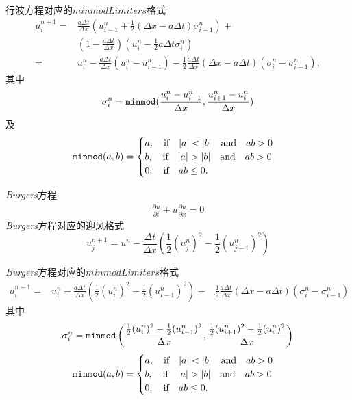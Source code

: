 \documentclass[10.5pt
]{article}
\begin{document}
 
行波方程对应的$minmod Limiters$格式
\begin{equation}
\begin{aligned}
u_i^{n+1}= & \frac{a \Delta t}{\Delta x}\left(u_{i-1}^n+\frac{1}{2}(\Delta x-a \Delta t) \sigma_{i-1}^n\right)+ \\
& \left(1-\frac{a \Delta t}{\Delta x}\right)\left(u_i^n-\frac{1}{2} a \Delta t \sigma_i^n\right) \\
= & u_i^n-\frac{a \Delta t}{\Delta x}\left(u_i^n-u_{i-1}^n\right)-\frac{1}{2} \frac{a \Delta t}{\Delta x}(\Delta x-a \Delta t)\left(\sigma_i^n-\sigma_{i-1}^n\right),
\end{aligned}
\end{equation}
其中
\begin{equation}
	\sigma_i^n = \verb|minmod| ( \frac{u_i^n - u_{i-1}^{n}}{ \Delta x }, \frac{u_{i+1}^n - u_{i}^{n}}{ \Delta x } )
\end{equation}
及
\begin{equation}
	\verb|minmod|(a, b) = 
	\begin{cases}
		a, \qif |a| < |b| \qand ab > 0\\
		b, \qif |a| > |b| \qand ab > 0\\
		0, \qif ab \leq 0.
	\end{cases}
\end{equation}

\textit{Burgers}方程
\begin{align}
\frac{\partial u}{\partial t} + u \frac{\partial u}{\partial x} = 0
\end{align}
\textit{Burgers}方程对应的迎风格式
\begin{equation}
u_j^{n+1} = u^n - \frac{\Delta t}{\Delta x} \left( \frac{1}{2} (u_j^n)^2 - \frac{1}{2} (u_{j-1}^n)^2\right)
\end{equation}

\textit{Burgers}方程对应的$minmod Limiters$格式
\begin{equation}
\begin{aligned}
u_i^{n+1}=&
  u_i^n-\frac{a \Delta t}{\Delta x}\left( \frac{1}{2} (u_i^n)^2- \frac{1}{2} (u_{i-1}^n)^2 \right)-
 &\frac{1}{2} \frac{a \Delta t}{\Delta x}(\Delta x-a \Delta t)\left(\sigma_i^n-\sigma_{i-1}^n\right)
\end{aligned}
\end{equation}
其中
\begin{equation}
	\sigma_i^n = \verb|minmod| \left( \frac{ \frac{1}{2} (u_i^n)^2 - \frac{1}{2} (u_{i-1}^{n})^2 }{ \Delta x }, \frac{ \frac{1}{2} (u_{i+1}^n)^2 - \frac{1}{2} (u_{i}^{n})^2}{ \Delta x } \right)
\end{equation}
\begin{equation}
	\verb|minmod|(a, b) = 
	\begin{cases}
		a, \qif |a| < |b| \qand ab > 0\\
		b, \qif |a| > |b| \qand ab > 0\\
		0, \qif ab \leq 0.
	\end{cases}
\end{equation}
\end{document}

